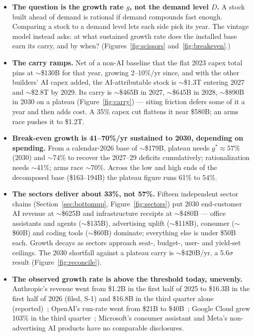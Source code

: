 \documentclass[11pt,letterpaper]{article}
\begin{document}
\begin{itemize}
    Charging $\sim$9.5\% a year on the losses, the flat path's hole is $\sim$\$1.5T by 2030 and $\sim$\$4.5T by 2035, against \$1.34T and \$3.05T added up plainly; an arms race reaches $\sim$\$8.5T by 2035; and even spending that follows revenue is still $\sim$\$800B short in 2035 (Table~\ref{tab:cumwacc}).
    \item \textbf{The question is the growth rate $g$, not the demand level $D$.} A stock built ahead of demand is rational if demand compounds fast enough. Comparing a stock to a demand level lets each side pick its year. The vintage model instead asks: at what sustained growth rate does the installed base earn its carry, and by when? (Figures~\ref{fig:scissors} and~\ref{fig:breakeven}.)
    \item \textbf{The carry ramps.} Net of a non-AI baseline that the flat 2023 capex total pins at $\sim$\$130B for that year, growing 2--10\%/yr since, and with the other builders' AI capex added, the AI-attributable stock is $\sim$\$1.3T entering 2027 and $\sim$\$2.8T by 2029. Its carry is $\sim$\$465B in 2027, $\sim$\$645B in 2028, $\sim$\$890B in 2030 on a plateau (Figure~\ref{fig:carry}) --- siting friction defers some of it a year and then adds cost. A 35\% capex cut flattens it near \$580B; an arms race pushes it to \$1.2T.
    \item \textbf{Break-even growth is 41--70\%/yr sustained to 2030, depending on spending.} From a calendar-2026 base of $\sim$\$179B, plateau needs $g^{*}\approx57\%$ (2030) and $\sim$74\% to recover the 2027--29 deficits cumulatively; rationalization needs $\sim$41\%; arms race $\sim$70\%. Across the low and high ends of the decomposed base (\$163--194B) the plateau figure runs 61\% to 54\%.
    \item \textbf{The sectors deliver about 33\%, not 57\%.} Fifteen independent sector chains (Section~\ref{sec:bottomup}, Figure~\ref{fig:sectors}) put 2030 end-customer AI revenue at $\sim$\$625B and infrastructure receipts at $\sim$\$480B --- office assistants and agents ($\sim$\$135B), advertising uplift ($\sim$\$118B), consumer ($\sim$\$60B) and coding tools ($\sim$\$60B) dominate; everything else is under \$50B each. Growth decays as sectors approach seat-, budget-, user- and yield-set ceilings. The 2030 shortfall against a plateau carry is $\sim$\$420B/yr, a 5.6$\sigma$ result (Figure~\ref{fig:reconcile}).
    \item \textbf{The observed growth rate is above the threshold today, unevenly.} Anthropic's revenue went from \$1.2B in the first half of 2025 to \$16.3B in the first half of 2026 (filed, S-1) and \$16.8B in the third quarter alone (reported)~\cite{ref:anthropic_s1,ref:cnbc_anthropic_q3}; OpenAI's run-rate went from \$21B to \$40B~\cite{ref:epoch_revenue}; Google Cloud grew 103\% in the third quarter~\cite{ref:alphabet_q3_2026}; Microsoft's consumer assistant and Meta's non-advertising AI products have no comparable disclosures.


\end{itemize}
\end{document}

